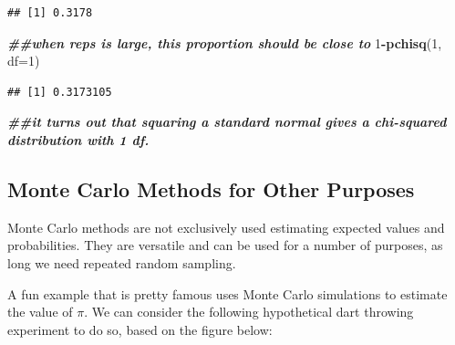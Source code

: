 \documentclass[
]{book}
\newenvironment{Shaded}{\begin{snugshade}}{\end{snugshade}}
\newcommand{\AttributeTok}[1]{\textcolor[rgb]{0.13,0.29,0.53}{#1}}
\newcommand{\DecValTok}[1]{\textcolor[rgb]{0.00,0.00,0.81}{#1}}
\newcommand{\DocumentationTok}[1]{\textcolor[rgb]{0.56,0.35,0.01}{\textbf{\textit{#1}}}}
\newcommand{\FunctionTok}[1]{\textcolor[rgb]{0.13,0.29,0.53}{\textbf{#1}}}
\newcommand{\NormalTok}[1]{#1}
\newcommand{\SpecialCharTok}[1]{\textcolor[rgb]{0.81,0.36,0.00}{\textbf{#1}}}
\begin{document}
\begin{verbatim}
## [1] 0.3178
\end{verbatim}

\begin{Shaded}
\begin{Highlighting}[]
\DocumentationTok{\#\#when reps is large, this proportion should be close to}
\DecValTok{1}\SpecialCharTok{{-}}\FunctionTok{pchisq}\NormalTok{(}\DecValTok{1}\NormalTok{, }\AttributeTok{df=}\DecValTok{1}\NormalTok{)}
\end{Highlighting}
\end{Shaded}

\begin{verbatim}
## [1] 0.3173105
\end{verbatim}

\begin{Shaded}
\begin{Highlighting}[]
\DocumentationTok{\#\#it turns out that squaring a standard normal gives a chi{-}squared distribution with 1 df.}
\end{Highlighting}
\end{Shaded}

\subsection{Monte Carlo Methods for Other Purposes}\label{monte-carlo-methods-for-other-purposes}

Monte Carlo methods are not exclusively used estimating expected values and probabilities. They are versatile and can be used for a number of purposes, as long we need repeated random sampling.

A fun example that is pretty famous uses Monte Carlo simulations to estimate the value of \(\pi\). We can consider the following hypothetical dart throwing experiment to do so, based on the figure below:
\end{document}
